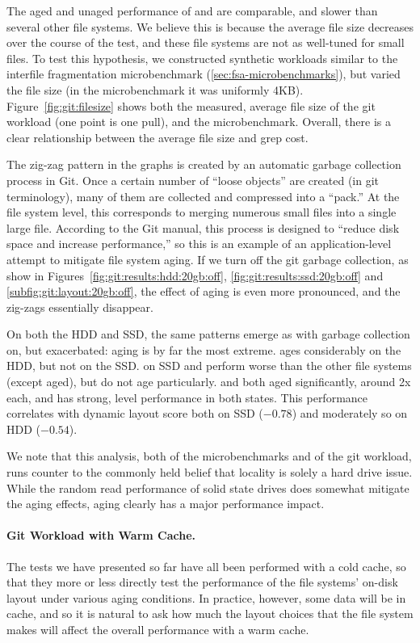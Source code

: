 The aged and unaged performance of \ext and \zfs are comparable, and slower
than several other file systems.  We believe this is because the average file
size decreases over the course of the test, and these file systems are not as
well-tuned for small files.  To test this hypothesis, we constructed synthetic
workloads similar to the interfile fragmentation microbenchmark
(\cref{sec:fsa-microbenchmarks}), but varied the file size (in the
microbenchmark it was uniformly 4KB).  Figure~\ref{fig:git:filesize} shows both
the measured, average file size of the git workload (one point is one pull),
and the microbenchmark.  Overall, there is a clear relationship between the
average file size and grep cost. 



The zig-zag pattern in the graphs is created by an automatic garbage collection
process in Git. Once a certain number of ``loose objects'' are created (in git
terminology), many of them are collected and compressed into a ``pack.'' At the
file system level, this corresponds to merging numerous small files into a
single large file.  According to the Git manual, this process is designed to
``reduce disk space and increase performance,'' so this is an example of an
application-level attempt to mitigate file system aging. If we turn off the git
garbage collection, as show in Figures~\ref{fig:git:results:hdd:20gb:off},
\ref{fig:git:results:ssd:20gb:off} and \ref{subfig:git:layout:20gb:off}, the
effect of aging is even more pronounced, and the zig-zags essentially
disappear.

On both the HDD and SSD, the same patterns emerge as with garbage collection
on, but exacerbated: \ftwofs aging is by far the most extreme.  \zfs ages
considerably on the HDD, but not on the SSD.  \zfs on SSD and \ext perform
worse than the other file systems (except \ftwofs aged), but do not age
particularly.  \xfs and \btrfs both aged significantly, around 2x each, and
\betrfs has strong, level performance in both states. This performance
correlates with dynamic layout score both on SSD ($-0.78$) and moderately so on
HDD ($-0.54$).

We note that this analysis, both of the microbenchmarks and of the git
workload, runs counter to the commonly held belief that locality is solely a
hard drive issue. While the random read performance of solid state drives does
somewhat mitigate the aging effects, aging clearly has a major performance
impact.

\paragraph{Git Workload with Warm Cache.} The tests we have presented so far
have all been performed with a cold cache, so that they more or less directly
test the performance of the file systems' on-disk layout under various aging
conditions. In practice, however, some data will be in cache, and so it is
natural to ask how much the layout choices that the file system makes will
affect the overall performance with a warm cache.

